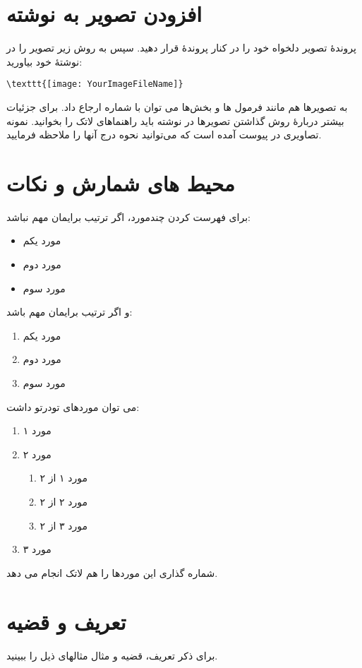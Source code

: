\section{افزودن تصویر به نوشته}
پروندهٔ تصویر دلخواه خود را در کنار پروندهٔ  قرار دهید. سپس به روش زیر تصویر را در نوشتهٔ خود بیاورید:
\begin{latin}
\begin{verbatim}
\texttt{[image: YourImageFileName]}
\end{verbatim}
\end{latin}
به تصویرها هم مانند فرمول ها و بخش‌ها می توان با شماره ارجاع داد. برای جزئیات بیشتر دربارهٔ روش گذاشتن تصویرها در نوشته باید راهنماهای لاتک را بخوانید. نمونه تصاویری در پیوست آمده است که می‌توانید نحوه درج آنها را ملاحظه فرمایید.


\section{محیط های شمارش و نکات}
برای فهرست کردن چندمورد، اگر ترتیب برایمان مهم نباشد:
\begin{itemize}
\item مورد یکم
\item مورد دوم
\item مورد سوم
\end{itemize}
و اگر ترتیب برایمان مهم باشد:
\begin{enumerate}
\item مورد یکم
\item مورد دوم
\item مورد سوم
\end{enumerate}
می توان موردهای تودرتو داشت:
\begin{enumerate}
\item مورد ۱
\item مورد ۲
\begin{enumerate}
\item مورد ۱ از ۲
\item مورد ۲ از ۲
\item مورد ۳ از ۲
\end{enumerate}
\item مورد ۳
\end{enumerate}
شماره گذاری این موردها را هم لاتک انجام می دهد.

\section{تعریف و قضیه}

برای ذکر تعریف، قضیه و مثال مثالهای ذیل را ببینید.

